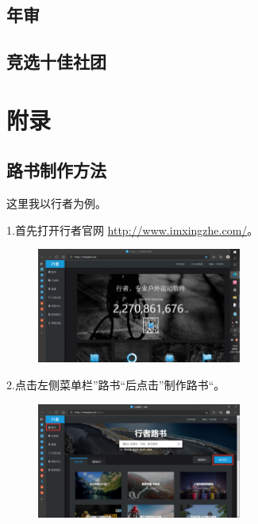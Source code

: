 \documentclass{ctexbook}
\begin{document}
\section{年审}
\section{竞选十佳社团}
\section{}
\chapter{附录}
\section{路书制作方法}
\label{chapter：路书制作方法}
这里我以行者为例。

1.首先打开行者官网 \href{http://www.imxingzhe.com/}{http://www.imxingzhe.com/}。

        \begin{figure}[H]
            \begin{center}
            \includegraphics[width=0.6\textwidth]{fig/行者1}
            \end{center}
        \end{figure}

2.点击左侧菜单栏''路书``后点击''制作路书``。
       \begin{figure}[H]
            \begin{center}
            \includegraphics[width=0.6\textwidth]{fig/行者2}
            \end{center}
        \end{figure}
\end{document}
